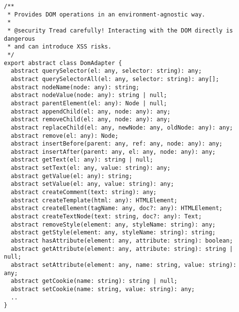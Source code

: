 \begin{verbatim}
/**
 * Provides DOM operations in an environment-agnostic way.
 *
 * @security Tread carefully! Interacting with the DOM directly is dangerous
 * and can introduce XSS risks.
 */
export abstract class DomAdapter {
  abstract querySelector(el: any, selector: string): any;
  abstract querySelectorAll(el: any, selector: string): any[];
  abstract nodeName(node: any): string;
  abstract nodeValue(node: any): string | null;
  abstract parentElement(el: any): Node | null;
  abstract appendChild(el: any, node: any): any;
  abstract removeChild(el: any, node: any): any;
  abstract replaceChild(el: any, newNode: any, oldNode: any): any;
  abstract remove(el: any): Node;
  abstract insertBefore(parent: any, ref: any, node: any): any;
  abstract insertAfter(parent: any, el: any, node: any): any;
  abstract getText(el: any): string | null;
  abstract setText(el: any, value: string): any;
  abstract getValue(el: any): string;
  abstract setValue(el: any, value: string): any;
  abstract createComment(text: string): any;
  abstract createTemplate(html: any): HTMLElement;
  abstract createElement(tagName: any, doc?: any): HTMLElement;
  abstract createTextNode(text: string, doc?: any): Text;
  abstract removeStyle(element: any, styleName: string): any;
  abstract getStyle(element: any, styleName: string): string;
  abstract hasAttribute(element: any, attribute: string): boolean;
  abstract getAttribute(element: any, attribute: string): string | null;
  abstract setAttribute(element: any, name: string, value: string): any;
  abstract getCookie(name: string): string | null;
  abstract setCookie(name: string, value: string): any;
  ..
}
\end{verbatim}
